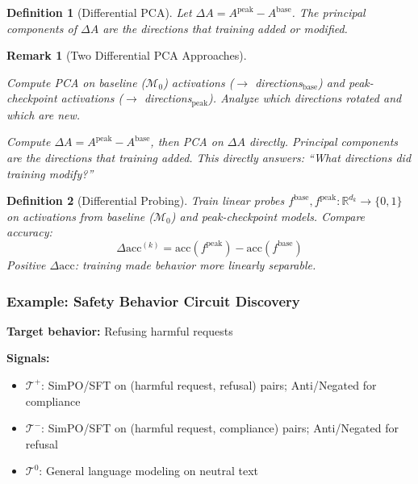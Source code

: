 \documentclass[11pt]{article}
\newtheorem{definition}{Definition}[section]
\newtheorem{remark}{Remark}[section]
\begin{document}
\begin{definition}[Differential PCA]
\label{def:differential-pca}
Let $\Delta A = A^{\text{peak}} - A^{\text{base}}$. The principal components of $\Delta A$ are the directions that training added or modified.
\end{definition}

\begin{remark}[Two Differential PCA Approaches]
\label{rem:two-differential-pca-approaches}
\begin{description}[nosep, leftmargin=1em]
\item[Approach 1 (Compare PCA results):] Compute PCA on baseline ($\mathcal{M}_0$) activations ($\to$ directions$_{\text{base}}$) and peak-checkpoint activations ($\to$ directions$_{\text{peak}}$). Analyze which directions rotated and which are new.
\item[Approach 2 (PCA on deltas, recommended):] Compute $\Delta A = A^{\text{peak}} - A^{\text{base}}$, then PCA on $\Delta A$ directly. Principal components are the directions that \emph{training added}. This directly answers: ``What directions did training modify?''
\end{description}
\end{remark}

\begin{definition}[Differential Probing]
\label{def:differential-probing}
Train linear probes $f^{\text{base}}, f^{\text{peak}}: \mathbb{R}^{d_k} \to \{0, 1\}$ on activations from baseline ($\mathcal{M}_0$) and peak-checkpoint models. Compare accuracy:
\begin{equation}
\Delta \text{acc}^{(k)} = \text{acc}(f^{\text{peak}}) - \text{acc}(f^{\text{base}})
\end{equation}
Positive $\Delta \text{acc}$: training made behavior more linearly separable.
\end{definition}

\subsubsection{Example: Safety Behavior Circuit Discovery}
\label{sec:example-safety-behavior-circuit-discovery}

\noindent\textbf{Target behavior:} Refusing harmful requests

\noindent\textbf{Signals:}
\begin{itemize}[nosep]
\item $\mathcal{T}^+$: SimPO/SFT on (harmful request, refusal) pairs; Anti/Negated for compliance
\item $\mathcal{T}^-$: SimPO/SFT on (harmful request, compliance) pairs; Anti/Negated for refusal
\item $\mathcal{T}^0$: General language modeling on neutral text
\end{itemize}
\end{document}
